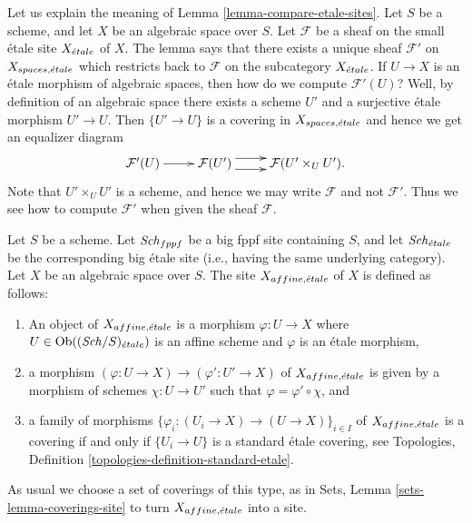 \begin{remark}
\label{remark-explain-equivalence}
Let us explain the meaning of Lemma \ref{lemma-compare-etale-sites}.
Let $S$ be a scheme, and let $X$ be an algebraic space over $S$.
Let $\mathcal{F}$ be a sheaf on the small \'etale site $X_{\acute{e}tale}$ of
$X$. The lemma says that there exists a unique sheaf $\mathcal{F}'$ on
$X_{spaces, {\acute{e}tale}}$ which restricts back to $\mathcal{F}$ on the
subcategory $X_{\acute{e}tale}$. If $U \to X$ is an \'etale morphism of
algebraic spaces, then how do we compute $\mathcal{F}'(U)$? Well, by definition
of an algebraic space there exists a scheme $U'$ and a surjective
\'etale morphism $U' \to U$. Then $\{U' \to U\}$ is a covering in
$X_{spaces, {\acute{e}tale}}$ and hence we get an equalizer diagram
$$
\xymatrix{
\mathcal{F}'(U) \ar[r] &
\mathcal{F}(U') \ar@<1ex>[r] \ar@<-1ex>[r] &
\mathcal{F}(U' \times_U U').
}
$$
Note that $U' \times_U U'$ is a scheme, and hence we may
write $\mathcal{F}$ and not $\mathcal{F}'$.
Thus we see how to compute $\mathcal{F}'$
when given the sheaf $\mathcal{F}$.
\end{remark}

\begin{definition}
\label{definition-affine-etale-site}
Let $S$ be a scheme.
Let $\mathit{Sch}_{fppf}$ be a big fppf site containing $S$,
and let $\mathit{Sch}_{\acute{e}tale}$ be the corresponding big \'etale site
(i.e., having the same underlying category).
Let $X$ be an algebraic space over $S$.
The site {\it $X_{affine, {\acute{e}tale}}$} of $X$ is defined as follows:
\begin{enumerate}
\item An object of $X_{affine, {\acute{e}tale}}$ is a morphism
$\varphi : U \to X$ where $U \in \mathop{\mathrm{Ob}}\nolimits((\mathit{Sch}/S)_{\acute{e}tale})$ is an affine scheme and
$\varphi$ is an \'etale morphism,
\item a morphism $(\varphi : U \to X) \to (\varphi' : U' \to X)$ of
$X_{affine, {\acute{e}tale}}$ is given by a morphism of schemes
$\chi : U \to U'$ such that $\varphi = \varphi' \circ \chi$, and
\item a family of morphisms
$\{\varphi_i : (U_i \to X) \to (U \to X)\}_{i \in I}$
of $X_{affine, {\acute{e}tale}}$ is a covering if and only if
$\{U_i \to U\}$ is a standard \'etale covering, see
Topologies, Definition \ref{topologies-definition-standard-etale}.
\end{enumerate}
As usual we choose a set of coverings of this type, as in
Sets, Lemma \ref{sets-lemma-coverings-site}
to turn $X_{affine, {\acute{e}tale}}$ into a site.
\end{definition}

